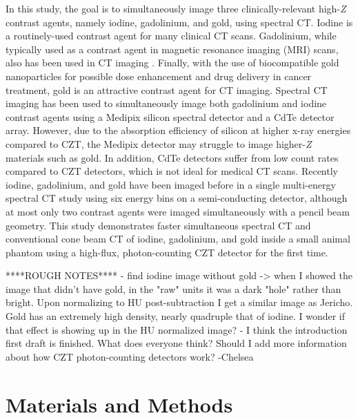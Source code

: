 \documentclass[journal, a4paper]{IEEEtran}
\begin{document}
In this study, the goal is to simultaneously image three clinically-relevant high-\textit{Z} contrast agents, namely iodine, gadolinium, and gold, using spectral CT. Iodine is a routinely-used contrast agent for many clinical CT scans. Gadolinium, while typically used as a contrast agent in magnetic resonance imaging (MRI) scans, also has been used in CT imaging \cite{taguchi2015imaging, bennett2014hybrid, si2018multicolour, feuerlein2008multienergy}. Finally, with the use of biocompatible gold nanoparticles for possible dose enhancement\cite{hainfeld} and drug delivery\cite{ghosh2008gold} in cancer treatment, gold is an attractive contrast agent for CT imaging. Spectral CT imaging has been used to simultaneously image both gadolinium and iodine contrast agents using a Medipix silicon spectral detector\cite{bennett2014hybrid} and a CdTe detector array\cite{schlomka2008experimental}. However, due to the absorption efficiency of silicon at higher x-ray energies compared to CZT, the Medipix detector may struggle to image higher-\textit{Z} materials such as gold. In addition, CdTe detectors suffer from low count rates compared to CZT detectors, which is not ideal for medical CT scans. Recently iodine, gadolinium, and gold have been imaged before in a single multi-energy spectral CT study using six energy bins on a semi-conducting detector, although at most only two contrast agents were imaged simultaneously with a pencil beam geometry\cite{si2018multicolour}. This study demonstrates faster simultaneous spectral CT and conventional cone beam CT of iodine, gadolinium, and gold inside a small animal phantom using a high-flux, photon-counting CZT detector for the first time.

****ROUGH NOTES****
- find iodine image without gold -> when I showed the image that didn't have gold, in the "raw" units it was a dark "hole" rather than bright. Upon normalizing to HU post-subtraction I get a similar image as Jericho. Gold has an extremely high density, nearly quadruple that of iodine. I wonder if that effect is showing up in the HU normalized image?
- I think the introduction first draft is finished. What does everyone think? Should I add more information about how CZT photon-counting detectors work? -Chelsea


\section{Materials and Methods}
\end{document}
